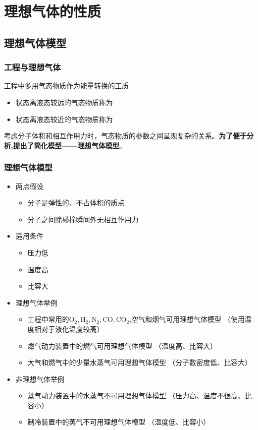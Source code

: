 \chapter{理想气体的性质}
\thispagestyle{empty}

\section{理想气体模型}
\subsection{工程与理想气体}
\noindent 工程中多用气态物质作为能量转换的工质
\begin{itemize}
	\item 状态离液态较远的气态物质称为
	\item 状态离液态较近的气态物质称为
\end{itemize}

考虑分子体积和相互作用力时，气态物质的参数之间呈现复杂的关系。\textbf{为了便于分析,提出了简化模型——理想气体模型}。
\vspace*{0.5em}

\subsection{理想气体模型}
\begin{itemize}
	\item 两点假设
	\begin{itemize}
		\item 分子是弹性的、不占体积的质点
		\item 分子之间除碰撞瞬间外无相互作用力
	\end{itemize}
	
	\item 适用条件
	\begin{itemize}
		\item 压力低
		\item 温度高
		\item 比容大
	\end{itemize}
	
	\item 理想气体举例
	\begin{itemize}
		\item 工程中常用的$\text{O}_2,\text{H}_2,\text{N}_2,\text{CO}, \text{CO}_2$,空气和烟气可用理想气体模型
		（使用温度相对于液化温度较高）
		\item 燃气动力装置中的燃气可用理想气体模型
		（温度高、比容大）
		\item 大气和燃气中的少量水蒸气可用理想气体模型
		（分子数密度低、比容大）
	\end{itemize}
	\item 非理想气体举例
	\begin{itemize}
		\item 蒸气动力装置中的水蒸气不可用理想气体模型
		（压力高、温度不很高、比容小）
		\item 制冷装置中的蒸气不可用理想气体模型
		（温度低、比容小）
	\end{itemize}
\end{itemize}

